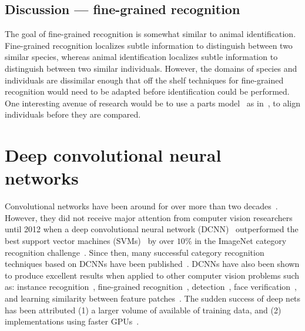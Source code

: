     \subsection{Discussion --- fine-grained recognition}
        The goal of fine-grained recognition is somewhat similar to animal identification. Fine-grained recognition
        localizes subtle information to distinguish between two similar species, whereas animal identification
        localizes subtle information to distinguish between two similar individuals. However, the domains of
        species and individuals are dissimilar enough that off the shelf techniques for fine-grained recognition
        would need to be adapted before identification could be performed. One interesting avenue of research would
        be to use a parts model~\cite{felzenszwalb_object_2010} as in~\cite{gavves_local_2014}, to align
        individuals before they are compared.


\section{Deep convolutional neural networks}\label{sec:dcnn}
    Convolutional networks have been around for over more than two decades~\cite{lecun_gradient_based_1998,
    fukushima_neocognitron_1988}. However, they did not receive major attention from computer vision researchers
    until 2012 when a deep convolutional neural network (DCNN)~\cite{krizhevsky_imagenet_2012} outperformed the
    best support vector machines (SVMs)~\cite{vapnik_statistical_1998} by over $10\percent$ in the ImageNet
    category recognition challenge~\cite{russakovsky_imagenet_2014}. Since then, many successful category
    recognition techniques based on DCNNs have been published~\cite{simonyan_very_2014, chatfield_efficient_2014,
    chatfield_return_2014, oquab_learning_2014, szegedy_going_2014, long_convnets_2014, he_spatial_2014,
    dean_fast_2013}. DCNNs have also been shown to produce excellent results when applied to other computer vision
    problems such as: %
    instance recognition~\cite{razavian_cnn_2014, razavian_baseline_2015, liu_learning_2015,
    held_deep_2015,arandjelovic_netvlad_2016,radenovic_cnn_2016}, %
    fine-grained recognition~\cite{branson_bird_2014, donahue_decaf_2013, catherine_wah_similarity_2014}, %
    detection~\cite{girshick_rich_2014, sermanet_overfeat_2013, li_wan_end_end_2015}, %
    face verification~\cite{huang_learning_2012, taigman_deepface_2014, sun_deep_2013}, %
    and learning similarity between feature patches~\cite{osendorfer_convolutional_2013, han_matchnet_2015,
    ng_exploiting_2015, zagoruyko_learning_2015, han_matchnet_2015}. The sudden success of deep nets has been
    attributed (1) a larger volume of available of training data, and (2) implementations using faster
    GPUs~\cite{krizhevsky_imagenet_2012}.
      
